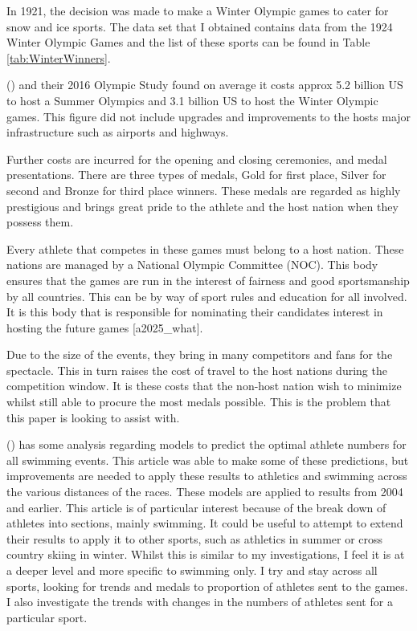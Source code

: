 \documentclass[
]{article}
\begin{document}
In 1921, the decision was made to make a Winter Olympic games to cater for snow and ice sports. The data set that I obtained contains data from the 1924 Winter Olympic Games and the list of these sports can be found in Table \ref{tab:WinterWinners}.

() and their 2016 Olympic Study found on average it costs approx 5.2 billion US to host a Summer Olympics and 3.1 billion US to host the Winter Olympic games. This figure did not include upgrades and improvements to the hosts major infrastructure such as airports and highways.

Further costs are incurred for the opening and closing ceremonies, and medal presentations. There are three types of medals, Gold for first place, Silver for second and Bronze for third place winners. These medals are regarded as highly prestigious and brings great pride to the athlete and the host nation when they possess them.

Every athlete that competes in these games must belong to a host nation. These nations are managed by a National Olympic Committee (NOC). This body ensures that the games are run in the interest of fairness and good sportsmanship by all countries. This can be by way of sport rules and education for all involved. It is this body that is responsible for nominating their candidates interest in hosting the future games {[}a2025\_what{]}.

Due to the size of the events, they bring in many competitors and fans for the spectacle. This in turn raises the cost of travel to the host nations during the competition window. It is these costs that the non-host nation wish to minimize whilst still able to procure the most medals possible. This is the problem that this paper is looking to assist with.

() has some analysis regarding models to predict the optimal athlete numbers for all swimming events. This article was able to make some of these predictions, but improvements are needed to apply these results to athletics and swimming across the various distances of the races. These models are applied to results from 2004 and earlier. This article is of particular interest because of the break down of athletes into sections, mainly swimming. It could be useful to attempt to extend their results to apply it to other sports, such as athletics in summer or cross country skiing in winter. Whilst this is similar to my investigations, I feel it is at a deeper level and more specific to swimming only. I try and stay across all sports, looking for trends and medals to proportion of athletes sent to the games. I also investigate the trends with changes in the numbers of athletes sent for a particular sport.
\end{document}
